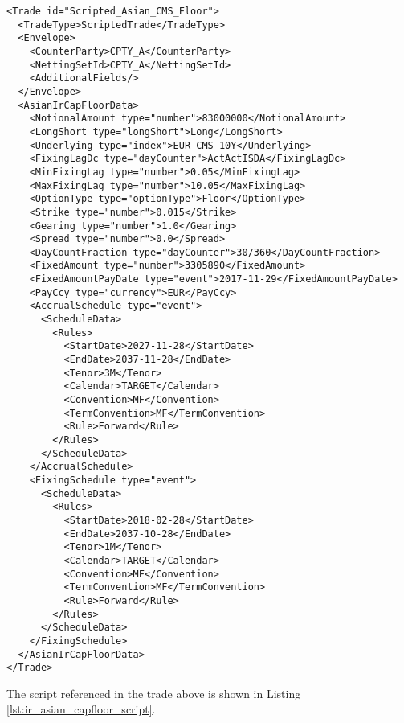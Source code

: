 \begin{verbatim}
<Trade id="Scripted_Asian_CMS_Floor">
  <TradeType>ScriptedTrade</TradeType>
  <Envelope>
    <CounterParty>CPTY_A</CounterParty>
    <NettingSetId>CPTY_A</NettingSetId>
    <AdditionalFields/>
  </Envelope>
  <AsianIrCapFloorData>
    <NotionalAmount type="number">83000000</NotionalAmount>
    <LongShort type="longShort">Long</LongShort>
    <Underlying type="index">EUR-CMS-10Y</Underlying>
    <FixingLagDc type="dayCounter">ActActISDA</FixingLagDc>
    <MinFixingLag type="number">0.05</MinFixingLag>
    <MaxFixingLag type="number">10.05</MaxFixingLag>
    <OptionType type="optionType">Floor</OptionType>
    <Strike type="number">0.015</Strike>
    <Gearing type="number">1.0</Gearing>
    <Spread type="number">0.0</Spread>
    <DayCountFraction type="dayCounter">30/360</DayCountFraction>
    <FixedAmount type="number">3305890</FixedAmount>
    <FixedAmountPayDate type="event">2017-11-29</FixedAmountPayDate>
    <PayCcy type="currency">EUR</PayCcy>
    <AccrualSchedule type="event">
      <ScheduleData>
        <Rules>
          <StartDate>2027-11-28</StartDate>
          <EndDate>2037-11-28</EndDate>
          <Tenor>3M</Tenor>
          <Calendar>TARGET</Calendar>
          <Convention>MF</Convention>
          <TermConvention>MF</TermConvention>
          <Rule>Forward</Rule>
        </Rules>
      </ScheduleData>
    </AccrualSchedule>
    <FixingSchedule type="event">
      <ScheduleData>
        <Rules>
          <StartDate>2018-02-28</StartDate>
          <EndDate>2037-10-28</EndDate>
          <Tenor>1M</Tenor>
          <Calendar>TARGET</Calendar>
          <Convention>MF</Convention>
          <TermConvention>MF</TermConvention>
          <Rule>Forward</Rule>
        </Rules>
      </ScheduleData>
    </FixingSchedule>
  </AsianIrCapFloorData>
</Trade>
\end{verbatim}

The script referenced in the trade above is shown in Listing \ref{lst:ir_asian_capfloor_script}.

